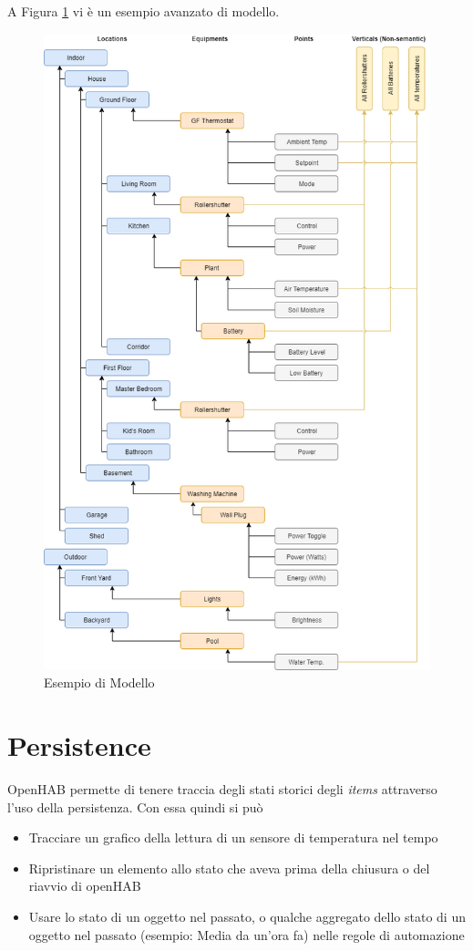 A Figura \ref{fig:example_model} vi è un esempio avanzato di modello.
\begin{figure}
    \centering
    \includegraphics[width=12cm]{Immagini/example_model}
    \caption{Esempio di Modello}
    \label{fig:example_model}
\end{figure}

\section{Persistence}
OpenHAB permette di tenere traccia degli stati storici degli {\em items} attraverso l'uso della persistenza. Con essa quindi si può 
\begin{itemize}
    \item Tracciare un grafico della lettura di un sensore di temperatura nel tempo
    \item Ripristinare un elemento allo stato che aveva prima della chiusura o del riavvio di openHAB
    \item Usare lo stato di un oggetto nel passato, o qualche aggregato dello stato di un oggetto nel passato (esempio: Media da un'ora fa) nelle regole di automazione 
\end{itemize}

